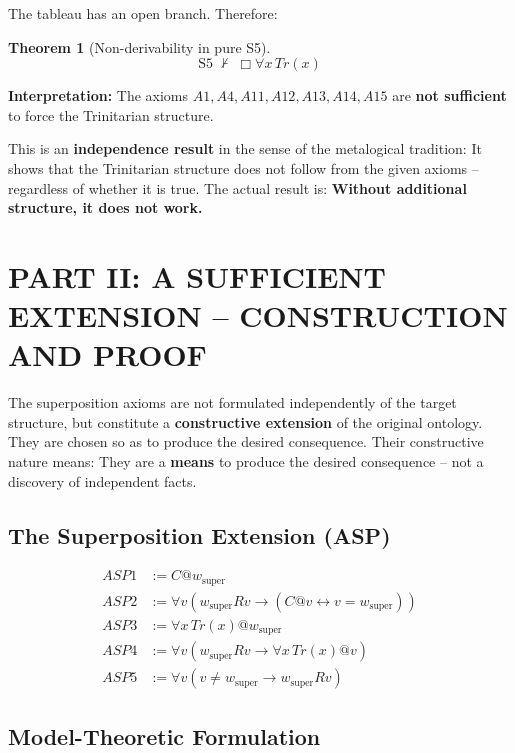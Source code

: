 \documentclass[
]{article}
\newtheorem{theorem}{Theorem}
\begin{document}
The tableau has an open branch. Therefore:

\begin{theorem}[Non-derivability in pure S5]
\[
\boxed{
\text{S5} \;\not\vdash\; \Box\forall x\,Tr(x)
}
\]
\end{theorem}

\textbf{Interpretation:} The axioms \(A1, A4, A11, A12, A13, A14, A15\) are \textbf{not sufficient} to force the Trinitarian structure.

This is an \textbf{independence result} in the sense of the metalogical tradition: It shows that the Trinitarian structure does not follow from the given axioms – regardless of whether it is true. The actual result is: \textbf{Without additional structure, it does not work.}

\section{PART II: A SUFFICIENT EXTENSION – CONSTRUCTION AND PROOF}

The superposition axioms are not formulated independently of the target structure, but constitute a \textbf{constructive extension} of the original ontology. They are chosen so as to produce the desired consequence. Their constructive nature means: They are a \textbf{means} to produce the desired consequence – not a discovery of independent facts.

\subsection{The Superposition Extension (ASP)}

\[
\begin{aligned}
ASP1 &:= C @ w_{\text{super}} \\
ASP2 &:= \forall v (w_{\text{super}} R v \rightarrow (C @ v \leftrightarrow v = w_{\text{super}})) \\
ASP3 &:= \forall x\,Tr(x) @ w_{\text{super}} \\
ASP4 &:= \forall v (w_{\text{super}} R v \rightarrow \forall x\,Tr(x) @ v) \\
ASP5 &:= \forall v (v \neq w_{\text{super}} \rightarrow w_{\text{super}} R v)
\end{aligned}
\]

\subsection{Model-Theoretic Formulation}
\end{document}
